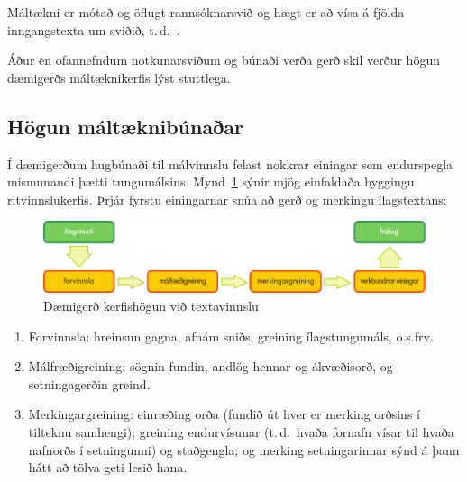 \documentclass{../../metanetpaper}
\begin{document}
\begin{multicols}{2}
Máltækni er mótað og öflugt rannsóknarsvið og hægt er að vísa á fjölda inngangstexta um sviðið, t.\,d.~\cite{carstensen-etal1, jurafsky-martin01, manning-schuetze1, lt-world1, lt-survey1}.

Áður en ofannefndum notkunarsviðum og búnaði verða gerð skil verður högun dæmigerðs máltæknikerfis lýst stuttlega.

\subsection{Högun máltæknibúnaðar}

Í dæmigerðum hugbúnaði til málvinnslu felast nokkrar einingar sem endurspegla mismunandi þætti tungumálsins. Mynd~\ref{fig:textprocessingarch_is} sýnir mjög einfaldaða byggingu ritvinnslukerfis. Þrjár fyrstu einingarnar snúa að gerð og merkingu ílagstextans: 

\begin{figure}[b]
  \center
  \includegraphics[width=\textwidth]{../_media/icelandic/text_processing_app_architecture}
  \caption{Dæmigerð kerfishögun við textavinnslu}
  \label{fig:textprocessingarch_is}
\end{figure}

\begin{enumerate}
\item Forvinnsla: hreinsun gagna, afnám sniðs, greining ílagstungumáls, o.s.frv.
\item Málfræðigreining: sögnin fundin, andlög hennar og ákvæðisorð, og setningagerðin greind.
\item Merkingargreining: einræðing orða (fundið út hver er merking orðsins í tilteknu samhengi); greining endurvísunar (t.\,d.~hvaða fornafn vísar til hvaða nafnorðs í setningunni) og staðgengla; og merking setningarinnar sýnd á þann hátt að tölva geti lesið hana.
\end{enumerate}


\end{multicols}
\end{document}
